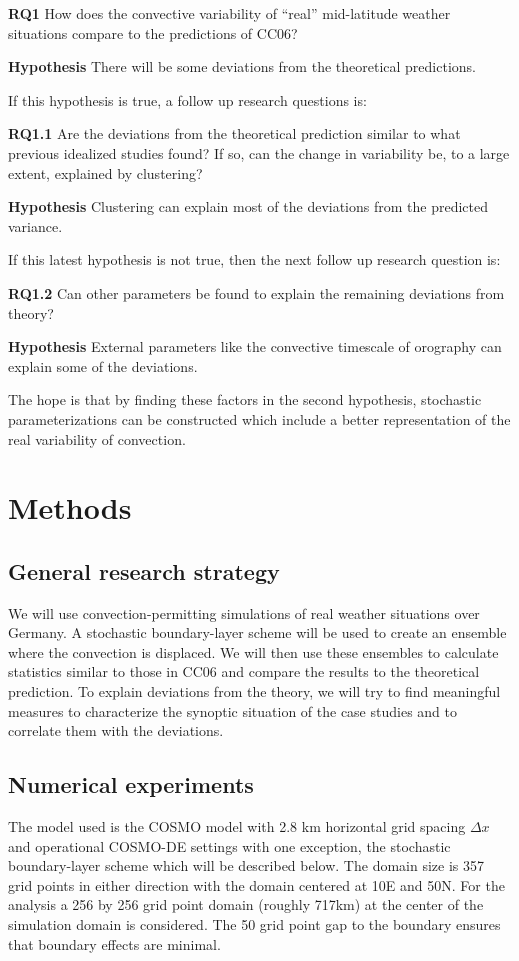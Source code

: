 \documentclass[a4paper, 12pt, draft]{article}
\begin{document}
\textbf{RQ1} How does the convective variability of ``real'' mid-latitude weather situations compare to the predictions of CC06?

\textbf{Hypothesis} There will be some deviations from the theoretical predictions. 

If this hypothesis is true, a follow up research questions is:

\textbf{RQ1.1} Are the deviations from the theoretical prediction similar to what previous idealized studies found? If so, can the change in variability be, to a large extent, explained by clustering?

\textbf{Hypothesis} Clustering can explain most of the deviations from the predicted variance.

If this latest hypothesis is not true, then the next follow up research question is:

\textbf{RQ1.2} Can other parameters be found to explain the remaining deviations from theory?

\textbf{Hypothesis} External parameters like the convective timescale of orography can explain some of the deviations.

The hope is that by finding these factors in the second hypothesis, stochastic parameterizations can be constructed which include a better representation of the real variability of convection. 

\section{Methods}

\subsection{General research strategy}
We will use convection-permitting simulations of real weather situations over Germany. A stochastic boundary-layer scheme will be used to create an ensemble where the convection is displaced. We will then use these ensembles to calculate statistics similar to those in CC06 and compare the results to the theoretical prediction. To explain deviations from the theory, we will try to find meaningful measures to characterize the synoptic situation of the case studies and to correlate them with the deviations.  

\subsection{Numerical experiments}
The model used is the COSMO model with 2.8 km horizontal grid spacing $\Delta x$ and operational COSMO-DE settings with one exception, the stochastic boundary-layer scheme which will be described below. The domain size is 357 grid points in either direction with the domain centered at 10E and 50N. For the analysis a 256 by 256 grid point domain (roughly 717km) at the center of the simulation domain is considered. The 50 grid point gap to the boundary ensures that boundary effects are minimal. 
\end{document}
